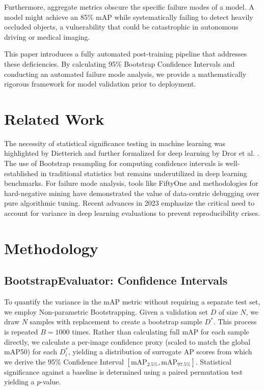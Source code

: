 \documentclass[conference]{IEEEtran}
\begin{document}
Furthermore, aggregate metrics obscure the specific failure modes of a model. A model might achieve an 85\% mAP while systematically failing to detect heavily occluded objects, a vulnerability that could be catastrophic in autonomous driving or medical imaging. 

This paper introduces a fully automated post-training pipeline that addresses these deficiencies. By calculating 95\% Bootstrap Confidence Intervals and conducting an automated failure mode analysis, we provide a mathematically rigorous framework for model validation prior to deployment.

\section{Related Work}
The necessity of statistical significance testing in machine learning was highlighted by Dietterich \cite{dietterich1998approximate} and further formalized for deep learning by Dror et al. \cite{dror2018hitchhiker}. The use of Bootstrap resampling \cite{efron1994introduction} for computing confidence intervals is well-established in traditional statistics but remains underutilized in deep learning benchmarks. For failure mode analysis, tools like FiftyOne \cite{moore2021fiftyone} and methodologies for hard-negative mining \cite{shrivastava2016training} have demonstrated the value of data-centric debugging over pure algorithmic tuning. Recent advances in 2023 \cite{bouthillier2023accounting} emphasize the critical need to account for variance in deep learning evaluations to prevent reproducibility crises.

\section{Methodology}

\subsection{BootstrapEvaluator: Confidence Intervals}
To quantify the variance in the mAP metric without requiring a separate test set, we employ Non-parametric Bootstrapping. Given a validation set $D$ of size $N$, we draw $N$ samples with replacement to create a bootstrap sample $D^*$. This process is repeated $B = 1000$ times. Rather than calculating full mAP for each sample directly, we calculate a per-image confidence proxy (scaled to match the global mAP50) for each $D^*_i$, yielding a distribution of surrogate AP scores from which we derive the 95\% Confidence Interval $[\text{mAP}_{2.5\%}, \text{mAP}_{97.5\%}]$. Statistical significance against a baseline is determined using a paired permutation test yielding a $p$-value.
\end{document}
